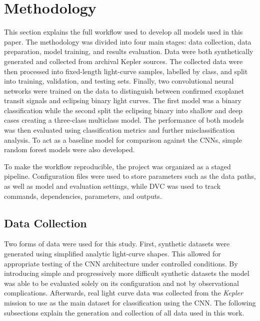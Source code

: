 \section{Methodology} \label{sec:methodology}

This section explains the full workflow used to develop all models used in this paper. The methodology was divided into four main stages: data collection, data preparation, model training, and results evaluation. Data were both synthetically generated and collected from archival Kepler sources. The collected data were then processed into fixed-length light-curve samples, labelled by class, and split into training, validation, and testing sets. Finally, two convolutional neural networks were trained on the data to distinguish between confirmed exoplanet transit signals and eclipsing binary light curves. The first model was a binary classification while the second split the eclipsing binary into shallow and deep cases creating a three-class multiclass model. The performance of both models was then evaluated using classification metrics and further misclassification analysis. To act as a baseline model for comparison against the CNNs, simple random forest models were also developed. 

To make the workflow reproducible, the project was organized as a staged pipeline. Configuration files were used to store parameters such as the data paths, as well as model and evaluation settings, while DVC was used to track commands, dependencies, parameters, and outputs.

\subsection{Data Collection}

Two forms of data were used for this study. First, synthetic datasets were generated using simplified analytic light-curve shapes. This allowed for appropriate testing of the CNN architecture under controlled conditions. By introducing simple and progressively more difficult synthetic datasets the model was able to be evaluated solely on its configuration and not by observational complications. Afterwards, real light curve data was collected from the \textit{Kepler} mission to use as the main dataset for classification using the CNN. The following subsections explain the generation and collection of all data used in this work.

